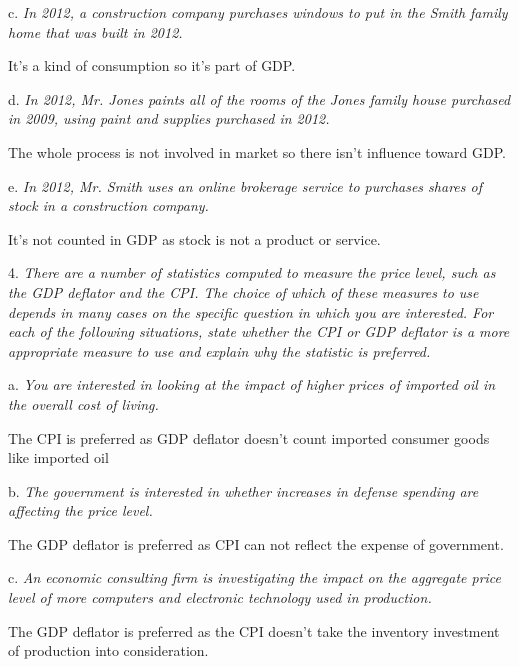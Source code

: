 \documentclass[10pt, a4paper]{article}
\begin{document}
        c. \emph{In 2012, a construction company purchases windows to put in the Smith family home
        that was built in 2012.}
        
        It's a kind of consumption so it's part of GDP. \newline

        d. \emph{In 2012, Mr. Jones paints all of the rooms of the Jones family house purchased in 2009,
        using paint and supplies purchased in 2012.}

        The whole process is not involved in market so there isn't influence toward GDP. \newline

        e. \emph{In 2012, Mr. Smith uses an online brokerage service to purchases shares of stock in a
        construction company.}
        
        It's not counted in GDP as stock is not a product or service. \newline

    4.  \emph{There are a number of statistics computed to measure the price level, such as the
        GDP deflator and the CPI. The choice of which of these measures to use depends in many
        cases on the specific question in which you are interested. For each of the following
        situations, state whether the CPI or GDP deflator is a more appropriate measure to use and
        explain why the statistic is preferred.}

        a.\emph{ You are interested in looking at the impact of higher prices of imported oil in the
        overall cost of living.}

            The CPI is preferred as GDP deflator doesn't count imported consumer goods like imported oil\newline

        
        b. \emph{The government is interested in whether increases in defense spending are affecting 
        the price level.}

            The GDP deflator is preferred as CPI can not reflect the expense of government. 
            

        c. \emph{An economic consulting firm is investigating the impact on the aggregate price level of
        more computers and electronic technology used in production.}

            The GDP deflator is preferred as the CPI doesn't take the inventory investment of production into consideration. \newline
    
\end{document}
